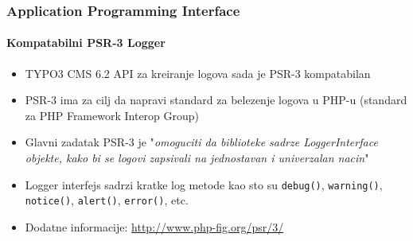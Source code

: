 \begin{frame}[fragile]
	\frametitle{Application Programming Interface}
	\framesubtitle{Kompatabilni PSR-3 Logger}

	\begin{itemize}
		\item TYPO3 CMS 6.2 API za kreiranje logova sada je PSR-3 kompatabilan
		\item PSR-3 ima za cilj da napravi standard za belezenje logova u PHP-u (standard za PHP Framework Interop Group)

		\item Glavni zadatak PSR-3 je
			"\emph{omoguciti da biblioteke sadrze LoggerInterface objekte, kako bi se logovi zapsivali na jednostavan i univerzalan nacin}"

		\item Logger interfejs sadrzi kratke log metode kao sto su\newline
			\texttt{debug()}, \texttt{warning()}, \texttt{notice()}, \texttt{alert()}, \texttt{error()}, etc.

		\item Dodatne informacije:\newline
			\url{http://www.php-fig.org/psr/3/}

	\end{itemize}

\end{frame}



